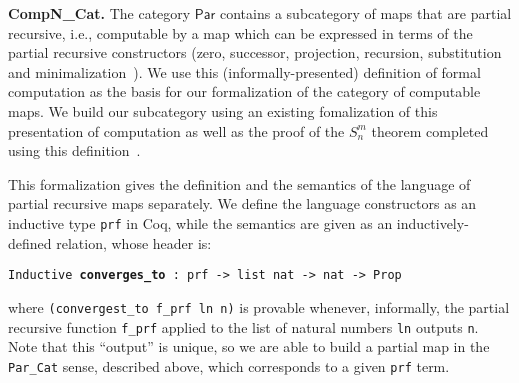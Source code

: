 \documentclass{entcs} \usepackage{entcsmacro}
\begin{document}

{\bfseries CompN\_Cat.} The category $\mathsf{Par}$ contains a subcategory of maps that are partial recursive, i.e., computable by a map which can be expressed in terms of the partial recursive constructors (zero, successor, projection, recursion, substitution and minimalization~\cite{Computability}). We use this (informally-presented) definition of formal computation as the basis for our formalization of the category of computable maps. We build our subcategory using an existing fomalization of this presentation of computation as well as the proof of the $S^m_n$ theorem completed using this definition~\cite{SmnForm}.

This formalization gives the definition and the semantics of the
language of partial recursive maps separately. We define the language
constructors as an inductive type {\tt prf} in Coq, while the
semantics are given as an inductively-defined relation, whose header is:

{\tt Inductive {\bfseries converges\_to} : prf -> list nat -> nat -> Prop} 

\noindent where {\tt (convergest\_to f\_prf ln n)} is provable whenever,
informally, the partial recursive function {\tt f\_prf} applied to the
list of natural numbers {\tt ln} outputs {\tt n}. Note that this
``output'' is unique, so we are able to build a partial map in the {\tt
  Par\_Cat} sense, described above, which corresponds to a given {\tt prf} term. 
\end{document}
